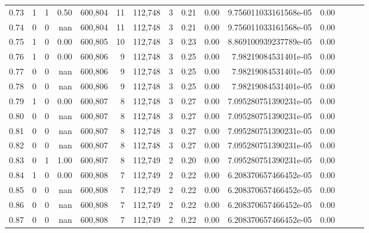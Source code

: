 \begin{tabular}{rrrrrrrrrrrrrrr}
0.73 &        1 &       1 &  0.50 &  600,804 &       11 &  112,748 &        3 &  0.21 &  0.00 &   9.756011033161568e-05 &      0.00 \\
0.74 &        0 &       0 &   nan &  600,804 &       11 &  112,748 &        3 &  0.21 &  0.00 &   9.756011033161568e-05 &      0.00 \\
0.75 &        1 &       0 &  0.00 &  600,805 &       10 &  112,748 &        3 &  0.23 &  0.00 &   8.869100939237789e-05 &      0.00 \\
0.76 &        1 &       0 &  0.00 &  600,806 &        9 &  112,748 &        3 &  0.25 &  0.00 &    7.98219084531401e-05 &      0.00 \\
0.77 &        0 &       0 &   nan &  600,806 &        9 &  112,748 &        3 &  0.25 &  0.00 &    7.98219084531401e-05 &      0.00 \\
0.78 &        0 &       0 &   nan &  600,806 &        9 &  112,748 &        3 &  0.25 &  0.00 &    7.98219084531401e-05 &      0.00 \\
0.79 &        1 &       0 &  0.00 &  600,807 &        8 &  112,748 &        3 &  0.27 &  0.00 &   7.095280751390231e-05 &      0.00 \\
0.80 &        0 &       0 &   nan &  600,807 &        8 &  112,748 &        3 &  0.27 &  0.00 &   7.095280751390231e-05 &      0.00 \\
0.81 &        0 &       0 &   nan &  600,807 &        8 &  112,748 &        3 &  0.27 &  0.00 &   7.095280751390231e-05 &      0.00 \\
0.82 &        0 &       0 &   nan &  600,807 &        8 &  112,748 &        3 &  0.27 &  0.00 &   7.095280751390231e-05 &      0.00 \\
0.83 &        0 &       1 &  1.00 &  600,807 &        8 &  112,749 &        2 &  0.20 &  0.00 &   7.095280751390231e-05 &      0.00 \\
0.84 &        1 &       0 &  0.00 &  600,808 &        7 &  112,749 &        2 &  0.22 &  0.00 &   6.208370657466452e-05 &      0.00 \\
0.85 &        0 &       0 &   nan &  600,808 &        7 &  112,749 &        2 &  0.22 &  0.00 &   6.208370657466452e-05 &      0.00 \\
0.86 &        0 &       0 &   nan &  600,808 &        7 &  112,749 &        2 &  0.22 &  0.00 &   6.208370657466452e-05 &      0.00 \\
0.87 &        0 &       0 &   nan &  600,808 &        7 &  112,749 &        2 &  0.22 &  0.00 &   6.208370657466452e-05 &      0.00 \\

\end{tabular}
